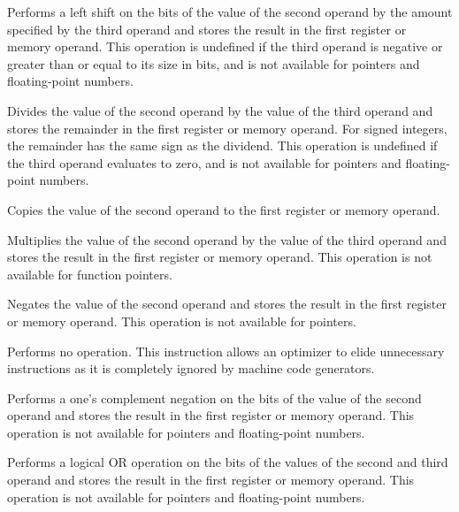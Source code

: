
Performs a left shift on the bits of the value of the second operand by the amount specified by the third operand and stores the result in the first register or memory operand.
This operation is undefined if the third operand is negative or greater than or equal to its size in bits, and is not available for pointers and floating-point numbers.


Divides the value of the second operand by the value of the third operand and stores the remainder in the first register or memory operand.
For signed integers, the remainder has the same sign as the dividend.
This operation is undefined if the third operand evaluates to zero, and is not available for pointers and floating-point numbers.


Copies the value of the second operand to the first register or memory operand.


Multiplies the value of the second operand by the value of the third operand and stores the result in the first register or memory operand.
This operation is not available for function pointers.


Negates the value of the second operand and stores the result in the first register or memory operand.
This operation is not available for pointers.


Performs no operation.
This instruction allows an optimizer to elide unnecessary instructions as it is completely ignored by machine code generators.


Performs a one's complement negation on the bits of the value of the second operand and stores the result in the first register or memory operand.
This operation is not available for pointers and floating-point numbers.


Performs a logical OR operation on the bits of the values of the second and third operand and stores the result in the first register or memory operand.
This operation is not available for pointers and floating-point numbers.

